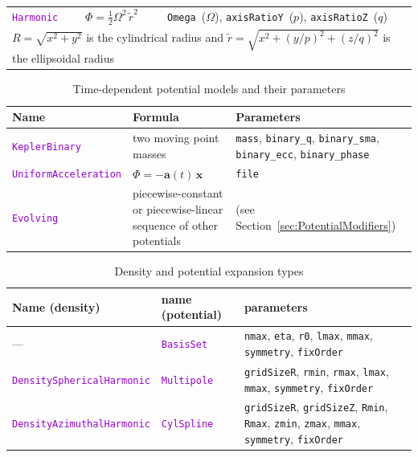 \documentclass[12pt]{article}
\newcommand{\ttt}[1]{\textcolor{darkviolet}{\texttt{#1}}}
\newcommand{\ppp}[1]{\textcolor{darkolive} {\texttt{#1}}}
\begin{document}
\begin{table}
\begin{tabular}{l m{50mm} >{\raggedright\arraybackslash}m{80mm}}
\ttt{Harmonic} & $\Phi = \frac{1}{2} \Omega^2\,\tilde r^2$ & \ppp{Omega}~($\Omega$), \ppp{axisRatioY}~($p$), \ppp{axisRatioZ}~($q$) \\[2mm]

\multicolumn{3}{l}{\footnotesize $R=\sqrt{x^2+y^2}$ is the cylindrical radius and $\tilde r=\sqrt{x^2+(y/p)^2+(z/q)^2}$ is the ellipsoidal radius}
\end{tabular}
\end{table}

\begin{table}
\caption{Time-dependent potential models and their parameters}  \label{tab:PotentialTimeDependent}
\begin{tabular}{l p{60mm} p{55mm}}
Name & Formula & Parameters \\
\hline
\ttt{KeplerBinary} & two moving point masses & \ppp{mass}, \ppp{binary_q}, \ppp{binary_sma}, \ppp{binary_ecc}, \ppp{binary_phase} \\[2mm]
\ttt{UniformAcceleration} & $\Phi=-\boldsymbol a(t)\,\boldsymbol x$ & \ppp{file} \\[2mm]
\ttt{Evolving} & piecewise-constant or piecewise-linear sequence of other potentials & (see Section~\ref{sec:PotentialModifiers})
\end{tabular}
\end{table}

\begin{table}
\caption{Density and potential expansion types}  \label{tab:ExpansionParams}
\begin{tabular}{l l p{7cm}}
Name (density) & name (potential) & parameters \\
\hline
--- & \ttt{BasisSet} & \ppp{nmax}, \ppp{eta}, \ppp{r0}, \ppp{lmax}, \ppp{mmax}, \ppp{symmetry}, \ppp{fixOrder} \\
\ttt{DensitySphericalHarmonic} & \ttt{Multipole} & \ppp{gridSizeR}, \ppp{rmin}, \ppp{rmax}, \ppp{lmax}, \ppp{mmax}, \ppp{symmetry}, \ppp{fixOrder}\\
\ttt{DensityAzimuthalHarmonic} & \ttt{CylSpline} & \ppp{gridSizeR}, \ppp{gridSizeZ}, \ppp{Rmin}, \ppp{Rmax}, \ppp{zmin}, \ppp{zmax}, \ppp{mmax}, \ppp{symmetry}, \ppp{fixOrder}
\end{tabular}
\end{table}
\end{document}

